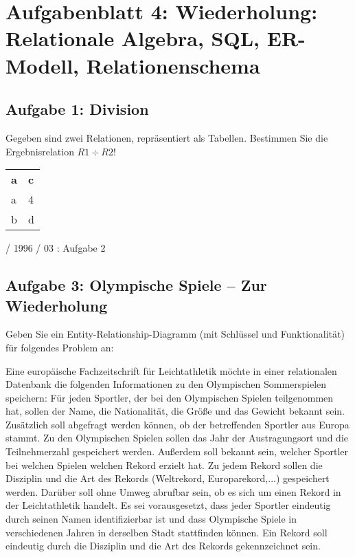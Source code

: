 \documentclass{lehramt-informatik-haupt}
\begin{document}
\chapter{Aufgabenblatt 4: Wiederholung: Relationale Algebra, SQL, ER-Modell, Relationenschema}

%

\section{Aufgabe 1: Division}

Gegeben sind zwei Relationen, repräsentiert als Tabellen. Bestimmen Sie
die Ergebnisrelation $R1 \div R2$!

\begin{antwort}
\begin{tabular}{ll}
\textbf{a} & \textbf{c} \\
a & 4 \\
b & d
\end{tabular}
\end{antwort}

%

 / 1996 / 03 : Aufgabe 2

%

\section{Aufgabe 3: Olympische Spiele – Zur Wiederholung}

Geben Sie ein Entity-Relationship-Diagramm (mit Schlüssel und
Funktionalität) für folgendes Problem an:

Eine europäische Fachzeitschrift für Leichtathletik möchte in einer
relationalen Datenbank die folgenden Informationen zu den Olympischen
Sommerspielen speichern: Für jeden Sportler, der bei den Olympischen
Spielen teilgenommen hat, sollen der Name, die Nationalität, die Größe
und das Gewicht bekannt sein. Zusätzlich soll abgefragt werden können,
ob der betreffenden Sportler aus Europa stammt. Zu den Olympischen
Spielen sollen das Jahr der Austragungsort und die Teilnehmerzahl
gespeichert werden. Außerdem soll bekannt sein, welcher Sportler bei
welchen Spielen welchen Rekord erzielt hat. Zu jedem Rekord sollen die
Disziplin und die Art des Rekords (Weltrekord, Europarekord,...)
gespeichert werden. Darüber soll ohne Umweg abrufbar sein, ob es sich um
einen Rekord in der Leichtathletik handelt. Es sei vorausgesetzt, dass
jeder Sportler eindeutig durch seinen Namen identifizierbar ist und dass
Olympische Spiele in verschiedenen Jahren in derselben Stadt stattfinden
können. Ein Rekord soll eindeutig durch die Disziplin und die Art des
Rekords gekennzeichnet sein.
\end{document}
